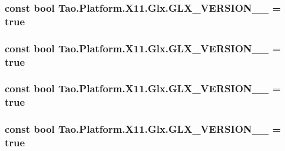 \label{class_tao_1_1_platform_1_1_x11_1_1_glx_ae1c13229f4b03607ede1ec39f5fdfade}
\hypertarget{class_tao_1_1_platform_1_1_x11_1_1_glx_a27c592286dce935d5c444c7d961cf901}{
\subsubsection[{GLX\_\-VERSION\_\-1\_\-1}]{\setlength{\rightskip}{0pt plus 5cm}const bool {\bf Tao.Platform.X11.Glx.GLX\_\-VERSION\_\_} = true}}
\label{class_tao_1_1_platform_1_1_x11_1_1_glx_a27c592286dce935d5c444c7d961cf901}
\hypertarget{class_tao_1_1_platform_1_1_x11_1_1_glx_aa86a895296cc69c0989e87378e7ea4c7}{
\subsubsection[{GLX\_\-VERSION\_\-1\_\-2}]{\setlength{\rightskip}{0pt plus 5cm}const bool {\bf Tao.Platform.X11.Glx.GLX\_\-VERSION\_\_} = true}}
\label{class_tao_1_1_platform_1_1_x11_1_1_glx_aa86a895296cc69c0989e87378e7ea4c7}
\hypertarget{class_tao_1_1_platform_1_1_x11_1_1_glx_a48ad50734126818cdcb41a659aead31c}{
\subsubsection[{GLX\_\-VERSION\_\-1\_\-3}]{\setlength{\rightskip}{0pt plus 5cm}const bool {\bf Tao.Platform.X11.Glx.GLX\_\-VERSION\_\_} = true}}
\label{class_tao_1_1_platform_1_1_x11_1_1_glx_a48ad50734126818cdcb41a659aead31c}
\hypertarget{class_tao_1_1_platform_1_1_x11_1_1_glx_a772129eb8346c477e9cdc01efa76e24e}{
\subsubsection[{GLX\_\-VERSION\_\-1\_\-4}]{\setlength{\rightskip}{0pt plus 5cm}const bool {\bf Tao.Platform.X11.Glx.GLX\_\-VERSION\_\_} = true}}
